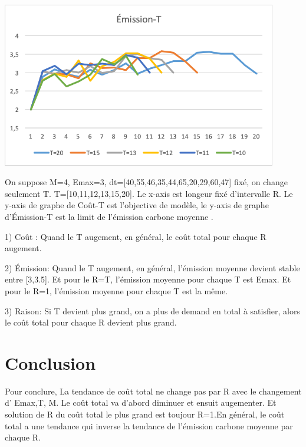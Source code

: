 \documentclass[12pt,a4paper]{article}
\begin{document}
\begin{minipage}[r]{.99\linewidth}
	\center\includegraphics[width=12cm]{img/change/t-emission.png}
	\begin{center}
	\end{center}
\end{minipage}
\begin{justify}
On suppose M=4, Emax=3, dt=[40,55,46,35,44,65,20,29,60,47] fixé, on change seulement T. T=[10,11,12,13,15,20]. Le x-axis est longeur fixé d'intervalle R. Le y-axis de graphe de Coût-T est l'objective de modèle, le y-axis de graphe d'Émission-T est la limit de l'émission carbone moyenne .
\end{justify}
\begin{justify}

1) Coût : Quand le T augement, en général, le coût total pour chaque R augement. 
\end{justify}
\begin{justify}
2) Émission: Quand le T augement, en général, l'émission moyenne devient stable entre [3,3.5]. Et pour le R=T,  l'émission moyenne pour chaque T est Emax. Et pour le R=1,  l'émission moyenne pour chaque T est la même.
\end{justify}
\begin{justify}
3) Raison: Si T devient plus grand, on a plus de demand en total à satisfier, alors le coût total pour chaque R devient plus grand. 
\end{justify}

\section{Conclusion}

Pour conclure, La tendance de coût total ne change pas par R avec le changement d' Emax,T, M. Le coût total va d'abord diminuer et ensuit augementer. Et solution de R du coût total le plus grand est toujour R=1.En général, le coût total a une tendance qui inverse la tendance de l'émission carbone moyenne par chaque R. 
\end{document}
